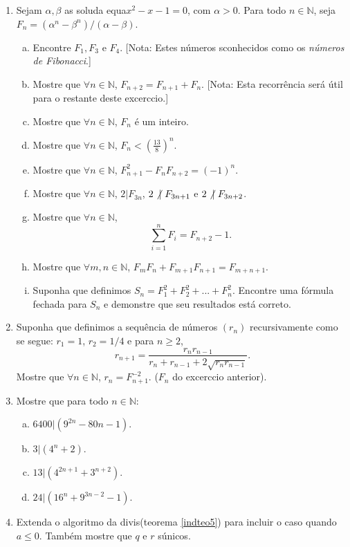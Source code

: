 \begin{enumerate}[{\bf 1.}]
\item Sejam $\alpha,\beta$ as solu\coes da equa\cao $x^2-x-1=0$, com $\alpha >0$. Para todo $n\in\mathbb{N}$, seja $F_n=(\alpha^n-\beta^n)/(\alpha-\beta)$.
\begin{enumerate}[a)]
\item Encontre $F_1,F_3$ e $F_4$. [Nota: Estes n\'umeros s\ao conhecidos como os {\it n\'umeros de Fibonacci}.] 
\item Mostre que $\forall n\in\mathbb{N}$, $F_{n+2}=F_{n+1}+F_n$. [Nota: Esta recorr\^encia ser\'a \'util para o restante deste excerc\ih cio.]  
\item Mostre que $\forall n\in\mathbb{N}$, $F_n$ \'e um inteiro.
\item Mostre que $\forall n\in\mathbb{N}$, $F_n<(\frac{13}{8})^n$.
\item Mostre que $\forall n\in\mathbb{N}$, $F^2_{n+1}-F_nF_{n+2}=(-1)^n$.
\item Mostre que $\forall n\in\mathbb{N}$, $2|F_{3n}$, $2\not|\textrm{ } F_{3n+1}$ e $2\not|\textrm{ } F_{3n+2}$.
\item Mostre que $\forall n\in\mathbb{N}$, 
\[
\sum_{i=1}^{n}F_i=F_{n+2}-1.
\]
\item Mostre que $\forall m,n\in\mathbb{N}$, $F_mF_n+F_{m+1}F_{n+1}=F_{m+n+1}$. 
\item Suponha que definimos $S_n=F_{1}^{2}+F_{2}^{2}+...+F_{n}^{2}$. Encontre uma f\'ormula fechada para $S_n$ e demonstre que seu resultados est\'a correto.
\end{enumerate}

\item Suponha que definimos a sequ\^encia de n\'umeros $(r_n)$ recursivamente como se segue: $r_1=1$, $r_2=1/4$ e para $n\geq 2$,
\[
r_{n+1}=\frac{r_nr_{n-1}}{r_n+r_{n-1}+2\sqrt{r_nr_{n-1}}}.
\]
Mostre que $\forall n\in\mathbb{N}$, $r_n=F^{-2}_{n+1}$. ($F_n$ do excerc\ih cio anterior).

\item Mostre que para todo $n\in\mathbb{N}:$
\begin{enumerate}[a)]
\item $6400|(9^{2n}-80n-1)$.
\item $3|(4^n+2)$.
\item $13|(4^{2n+1}+3^{n+2})$.
\item $24|(16^n+9^{3n-2}-1)$.
\end{enumerate}

\item Extenda o algoritmo da divis\ao (teorema \ref{indteo5}) para incluir o caso quando $a\leq 0$. Tamb\'em mostre que $q$ e $r$ s\ao \'unicos.


\end{enumerate}
